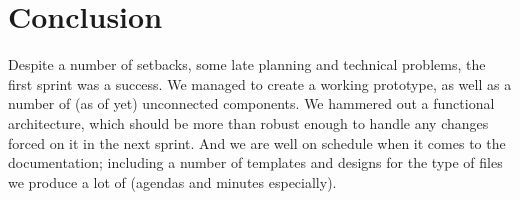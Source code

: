 \section{Conclusion}

Despite a number of setbacks, some late planning and technical problems, the first sprint was a success. We managed to create a working prototype, as well as a number of (as of yet) unconnected components. We hammered out a functional architecture, which should be more than robust enough to handle any changes forced on it in the next sprint. And we are well on schedule when it comes to the documentation; including a number of templates and designs for the type of files we produce a lot of (agendas and minutes especially). 